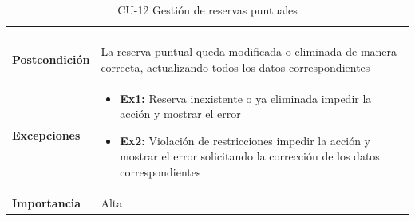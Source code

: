 \begin{table}[p]
\begin{tabularx}{\linewidth}{ p{} p{} }
\begin{enumerate}
		\end{enumerate}\\
		\textbf{Postcondición} & La reserva puntual queda modificada o eliminada de manera correcta, actualizando todos los datos correspondientes \\
		\textbf{Excepciones}          & 
		\begin{itemize}
			\tightlist
			\item \textbf{Ex1:} Reserva inexistente o ya eliminada \textrightarrow{} impedir la acción y mostrar el error
			\item \textbf{Ex2:} Violación de restricciones \textrightarrow{} impedir la acción y mostrar el error solicitando la corrección de los datos correspondientes
		\end{itemize} \\
		\textbf{Importancia}          & Alta \\
		\bottomrule
	\end{tabularx}
	\caption{CU-12 Gestión de reservas puntuales}
\end{table}


